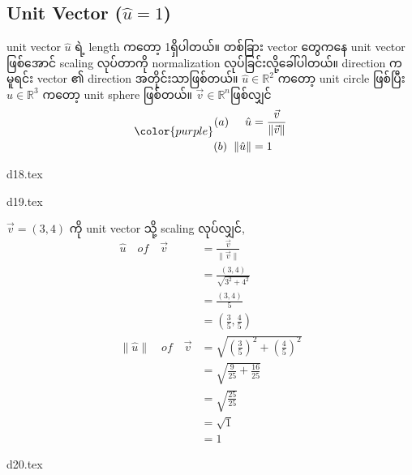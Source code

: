 \subsection{Unit Vector ($\hat{u}=1$)}

unit vector $\hat{u}$ ရဲ့ length ကတော့ 1ရှိပါတယ်။ တစ်ခြား vector တွေကနေ unit vector ဖြစ်အောင် scaling လုပ်တာကို normalization လုပ်ခြင်းလို့ခေါ်ပါတယ်။
direction က မူရင်း vector ၏ direction အတိုင်းသာဖြစ်တယ်။ $\hat{u}\in\mathbb{R}^2$ ကတော့ unit circle ဖြစ်ပြီး $\hat{u}\in\mathbb{R}^3$ ကတော့ unit sphere ဖြစ််တယ်။
$\vec{v}\in\mathbb{R}^n$ဖြစ်လျှင်
\begin{equation}
    {\color{purple} \begin{split}
            (a)\hspace{5mm}\hat{u}     & =\frac{\vec{v}}{\|\vec{v}\|} \\
            (b)\hspace{2mm}\|\hat{u}\| & =1
        \end{split}}
\end{equation}
\begin{minipage}{0.45\textwidth}
    \centering
    {d18.tex}
\end{minipage}
\hfill
\begin{minipage}{0.45\textwidth}
    \centering
    {d19.tex}
\end{minipage}

$\vec{v}=(3,4)$ ကို unit vector သို့ scaling လုပ်လျှင်,
\[
    \begin{split}
        \hat{u}\quad of\quad\vec{v}      & =\frac{\vec{v}}{\|\vec{v}\|}             \\
                                         & =\frac{(3,4)}{\sqrt{3^2+4^2}}            \\
                                         & =\frac{(3,4)}{5}                         \\
                                         & =(\frac{3}{5},\frac{4}{5})               \\
        \|\hat{u}\|\quad of \quad\vec{v} & = \sqrt{(\frac{3}{5})^2+(\frac{4}{5})^2} \\
                                         & = \sqrt{\frac{9}{25}+\frac{16}{25}}      \\
                                         & = \sqrt{\frac{25}{25}}                   \\
                                         & = \sqrt{1}                               \\
                                         & = 1
    \end{split}
\]
\begin{center}

    {d20.tex}
\end{center}

